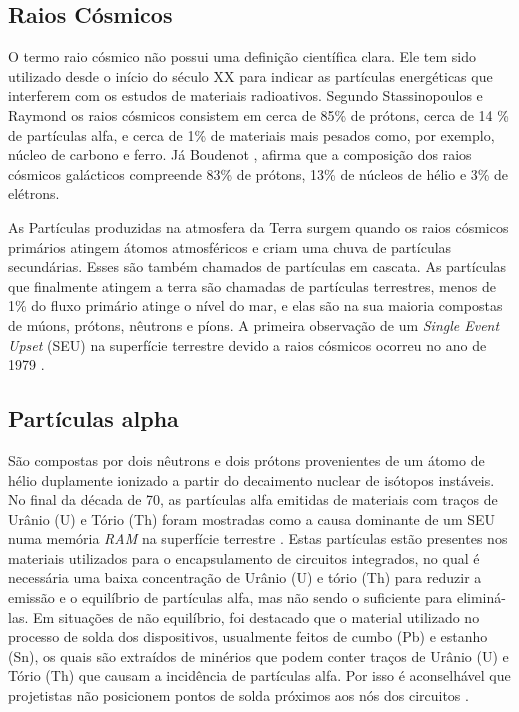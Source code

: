 \subsection{Raios Cósmicos} \label{subsec:raiosCosmicos}

O termo raio cósmico não possui uma definição científica clara. Ele tem sido utilizado desde o início do século XX para indicar as partículas energéticas que interferem com os estudos de materiais radioativos. Segundo Stassinopoulos e Raymond \cite{Stassinopoulos:1988} os raios cósmicos consistem em cerca de 85\% de prótons, cerca de 14 \% de partículas alfa, e cerca de 1\% de materiais mais pesados como, por exemplo, núcleo de carbono e ferro. Já Boudenot \cite{Boudenot:2007}, afirma que a composição dos raios cósmicos galácticos compreende 83\% de prótons, 13\% de núcleos de hélio e 3\% de elétrons. 

As Partículas produzidas na atmosfera da Terra surgem quando os raios cósmicos primários atingem átomos atmosféricos e criam uma chuva de partículas secundárias. Esses são também chamados de partículas em cascata. As partículas que finalmente atingem a terra são chamadas de partículas terrestres, menos de 1\% do fluxo primário atinge o nível do mar, e elas são na sua maioria compostas de múons, prótons, nêutrons e píons. A primeira observação de um \textit{Single Event Upset} (SEU) na superfície terrestre devido a raios cósmicos ocorreu no ano de 1979 \cite{ZieglerLandFord:1979}.


\subsection{Partículas alpha}

São compostas por dois nêutrons e dois prótons provenientes de um átomo de hélio duplamente ionizado a partir do decaimento nuclear de isótopos instáveis. No final da década de 70, as partículas alfa emitidas de materiais com traços de Urânio (U) e Tório (Th) foram mostradas como a causa dominante de um SEU numa memória \textit{RAM} na superfície terrestre \cite{Woods:1978}. Estas partículas estão presentes nos materiais utilizados para o encapsulamento de circuitos integrados, no qual é necessária uma baixa concentração de Urânio (U) e tório (Th) para reduzir a emissão e o equilíbrio de partículas alfa, mas não sendo o suficiente para eliminá-las. Em situações de não equilíbrio, foi destacado que o material utilizado no processo de solda dos dispositivos, usualmente feitos de cumbo (Pb) e estanho (Sn), os quais são extraídos de minérios que podem conter traços de Urânio (U) e Tório (Th) que causam a incidência de partículas alfa. Por isso é aconselhável que projetistas não posicionem pontos de solda próximos aos nós dos circuitos \cite{Velazco:2007}.


